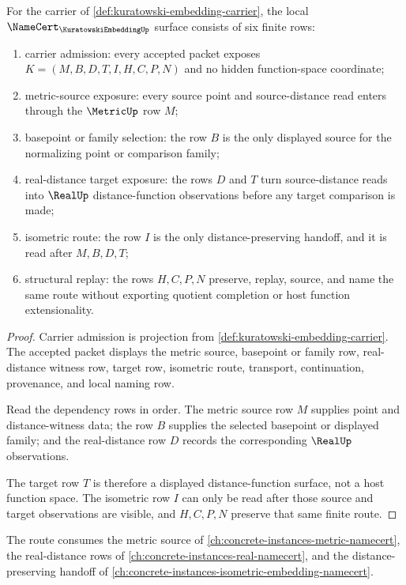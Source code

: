 \begin{theorem}
\label{thm:kuratowski-embedding-namecert-obligations}
For the carrier of \autoref{def:kuratowski-embedding-carrier}, the local $\NameCert_{\KuratowskiEmbeddingUp}$ surface consists of six finite rows:
\begin{enumerate}
\item carrier admission: every accepted packet exposes $K=(M,B,D,T,I,H,C,P,N)$ and no hidden function-space coordinate;
\item metric-source exposure: every source point and source-distance read enters through the $\MetricUp$ row $M$;
\item basepoint or family selection: the row $B$ is the only displayed source for the normalizing point or comparison family;
\item real-distance target exposure: the rows $D$ and $T$ turn source-distance reads into $\RealUp$ distance-function observations before any target comparison is made;
\item isometric route: the row $I$ is the only distance-preserving handoff, and it is read after $M,B,D,T$;
\item structural replay: the rows $H,C,P,N$ preserve, replay, source, and name the same route without exporting quotient completion or host function extensionality.
\end{enumerate}
\end{theorem}
\begin{proof}
Carrier admission is projection from \autoref{def:kuratowski-embedding-carrier}. The accepted packet displays the metric source, basepoint or family row, real-distance witness row, target row, isometric route, transport, continuation, provenance, and local naming row.

Read the dependency rows in order. The metric source row $M$ supplies point and distance-witness data; the row $B$ supplies the selected basepoint or displayed family; and the real-distance row $D$ records the corresponding $\RealUp$ observations.

The target row $T$ is therefore a displayed distance-function surface, not a host function space. The isometric row $I$ can only be read after those source and target observations are visible, and $H,C,P,N$ preserve that same finite route.
\end{proof}

The route consumes the metric source of \autoref{ch:concrete-instances-metric-namecert}, the real-distance rows of \autoref{ch:concrete-instances-real-namecert}, and the distance-preserving handoff of \autoref{ch:concrete-instances-isometric-embedding-namecert}.

